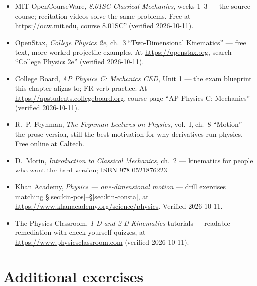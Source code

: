 \begin{itemize}
\item MIT OpenCourseWare, \emph{8.01SC Classical Mechanics}, weeks 1--3 ---
the source course; recitation videos solve the same problems. Free at
\url{https://ocw.mit.edu}, course 8.01SC'' (verified 2026-10-11).
\item OpenStax, \emph{College Physics 2e}, ch.~3 ``Two-Dimensional
Kinematics'' --- free text, more worked projectile examples. At
\url{https://openstax.org}, search ``College Physics 2e'' (verified 2026-10-11).
\item College Board, \emph{AP Physics C: Mechanics CED}, Unit 1 --- the exam
blueprint this chapter aligns to; FR verb practice. At
\url{https://apstudents.collegeboard.org}, course page ``AP Physics C:
Mechanics'' (verified 2026-10-11).
\item R.~P. Feynman, \emph{The Feynman Lectures on Physics}, vol.~I, ch.~8
``Motion'' --- the prose version, still the best motivation for why
derivatives run physics. Free online at Caltech.
\item D.~Morin, \emph{Introduction to Classical Mechanics}, ch.~2 ---
kinematics for people who want the hard version; ISBN 978-0521876223.
\item Khan Academy, \emph{Physics --- one-dimensional motion} --- drill
exercises matching \S\ref{sec:kin-pos}--\S\ref{sec:kin-consta}, at
\url{https://www.khanacademy.org/science/physics}. Verified 2026-10-11.
\item The Physics Classroom, \emph{1-D and 2-D Kinematics} tutorials ---
readable remediation with check-yourself quizzes, at
\url{https://www.physicsclassroom.com} (verified 2026-10-11).
\end{itemize}

\section*{Additional exercises}

